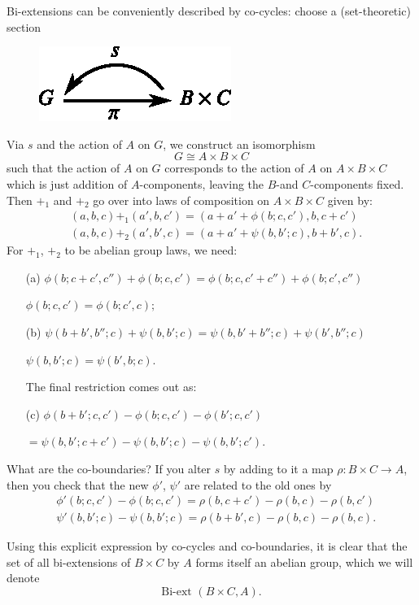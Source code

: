 Bi-extensions can be conveniently described by co-cycles: choose a (set-theoretic) section
\begin{figure}[H]
\centering
\includegraphics{figures/fig1.eps}
\end{figure}
Via $s$ and the action of $A$ on $G$, we construct an isomorphism
$$
G\cong A\times B\times C
$$
such that the action of $A$ on $G$ corresponds to the action of $A$ on $A\times B\times C$ which is just addition of $A$-components, leaving the $B$-and $C$-components fixed. Then $+_{1}$ and $+_{2}$ go over into laws of composition on $A\times B\times C$ given by:
\begin{align*}
& (a,b,c)+_{1}(a',b,c')=(a+a'+\phi(b;c,c'),b,c+c')\\
& (a,b,c)+_{2}(a',b',c)=(a+a'+\psi (b,b';c),b+b',c).
\end{align*}
For $+_{1}$, $+_{2}$ to be abelian group laws, we need:
\begin{itemize}
\item[(a)] $\phi(b;c+c',c'')+\phi(b;c,c')=\phi(b;c,c'+c'')+\phi(b;c',c'')$

\centerline{$\phi(b;c,c')=\phi(b;c',c);$}

\item[(b)] $\psi(b+b',b'';c)+\psi(b,b';c)=\psi(b,b'+b'';c)+\psi(b',b'';c)$

\centerline{$\psi(b,b';c)=\psi(b',b;c)$.}
\smallskip


The final restriction comes out as:
\item[(c)] $\phi(b+b';c,c')-\phi(b;c,c')-\phi(b';c,c')$\pageoriginale

$=\psi(b,b';c+c')-\psi(b,b';c)-\psi(b,b';c')$.
\end{itemize}
What are the co-boundaries? If you alter $s$ by adding to it a map $\rho:B\times C\to A$, then you check that the new $\phi'$, $\psi'$ are related to the old ones by
\begin{align*}
&\phi'(b;c,c')-\phi(b;c,c')=\rho(b,c+c')-\rho(b,c)-\rho(b,c')\\
&\psi'(b,b';c)-\psi(b,b';c)=\rho(b+b',c)-\rho(b,c)-\rho(b,c).
\end{align*}

Using this explicit expression by co-cycles and co-boundaries, it is clear that the set of all bi-extensions of $B\times C$ by $A$ forms itself an abelian group, which we will denote
$$
\text{Bi-ext~}(B\times C,A).
$$

